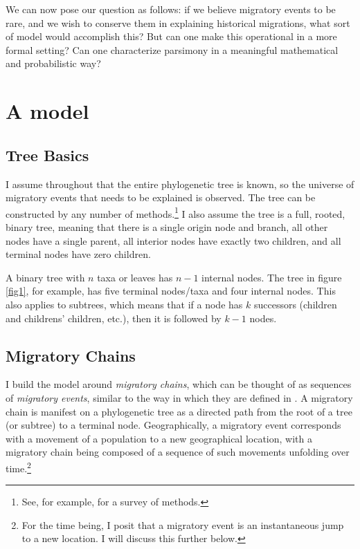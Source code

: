 \documentclass[11pt]{article}
\begin{document}
We can now pose our question as follows: if we believe migratory events to be rare, and we wish to conserve them in explaining historical migrations, what sort of model would accomplish this? But can one make this operational in a more formal setting? Can one characterize parsimony in a meaningful mathematical and probabilistic way? 

\section{A model}

\subsection{Tree Basics}

I assume throughout that the entire phylogenetic tree is known, so the universe of migratory events that needs to be explained is observed. The tree can be constructed by any number of methods.\footnote{See, for example, \citet{nichols97} for a survey of methods.  } I also assume the tree is a full, rooted, binary tree, meaning that there is a single origin node and branch, all other nodes have a single parent, all interior nodes have exactly two children, and all terminal nodes have zero children. 

A binary tree with $n$ taxa or leaves has $n-1$ internal nodes. The tree in figure \ref{fig1}, for example,  has five terminal nodes/taxa  and four internal nodes. This also applies to subtrees, which means that if a node has $k$ successors (children and childrens' children, etc.), then it is followed by $k-1$ nodes.

\subsection{Migratory Chains}
 
I build the model around \textit{migratory chains}, which can be thought of as sequences of \textit{migratory events}, similar to the way in which they are defined in \cite{dyen56}. A migratory chain is manifest on a phylogenetic tree as a directed path from the root of a tree (or subtree) to a terminal node. Geographically, a migratory event corresponds with a movement of a population to a new geographical location, with a migratory chain being composed of a sequence of such movements unfolding over time.\footnote{For the time being, I posit that a migratory event is an instantaneous jump to a new location. I will discuss this further below.}
\end{document}

